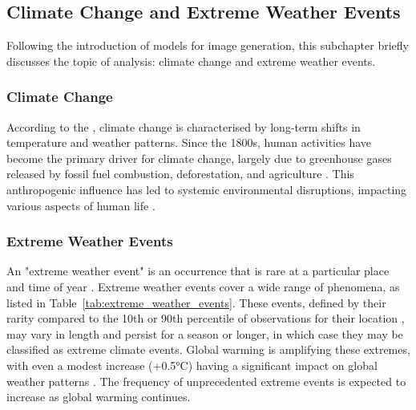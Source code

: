 \subsection{Climate Change and Extreme Weather Events}
\label{subsec:climate-change-and-extreme-weather}
Following the introduction of models for image generation, this subchapter briefly discusses the topic of analysis: climate change and extreme weather events.

\subsubsection{Climate Change}

According to the \textcite{UNClimateChange}, climate change is characterised by long-term shifts in temperature and weather patterns. Since the 1800s, human activities have become the primary driver for climate change, largely due to greenhouse gases released by fossil fuel combustion, deforestation, and agriculture \parencite{ipcc2023_wg2_1}. This anthropogenic influence has led to systemic environmental disruptions, impacting various aspects of human life \parencite{ipcc_2023_policy}.

\subsubsection{Extreme Weather Events}
\label{subsubsec:extreme-weather}
An "extreme weather event" is an occurrence that is rare at a particular place and time of year \parencite[2908]{ipcc_2023_wg2_full}. Extreme weather events cover a wide range of phenomena, as listed in Table~\ref{tab:extreme_weather_events}. These events, defined by their rarity compared to the 10th or 90th percentile of observations for their location \parencite[2908]{ipcc_2023_wg2_full}, may vary in length and persist for a season or longer, in which case they may be classified as extreme climate events. Global warming is amplifying these extremes, with even a modest increase (+0.5°C) having a significant impact on global weather patterns \parencite[1583]{ipcc2023_wg1_11}. The frequency of unprecedented extreme events is expected to increase as global warming continues.

